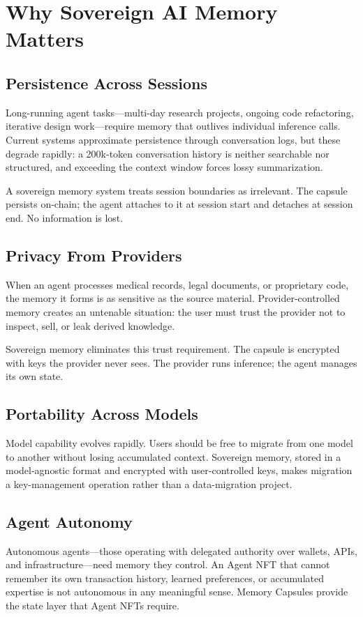 \section{Why Sovereign AI Memory Matters}

\label{sec:why}

\subsection{Persistence Across Sessions}

Long-running agent tasks---multi-day research projects, ongoing code refactoring, iterative design work---require memory that outlives individual inference calls. Current systems approximate persistence through conversation logs, but these degrade rapidly: a 200k-token conversation history is neither searchable nor structured, and exceeding the context window forces lossy summarization.

A sovereign memory system treats session boundaries as irrelevant. The capsule persists on-chain; the agent attaches to it at session start and detaches at session end. No information is lost.

\subsection{Privacy From Providers}

When an agent processes medical records, legal documents, or proprietary code, the memory it forms is as sensitive as the source material. Provider-controlled memory creates an untenable situation: the user must trust the provider not to inspect, sell, or leak derived knowledge.

Sovereign memory eliminates this trust requirement. The capsule is encrypted with keys the provider never sees. The provider runs inference; the agent manages its own state.

\subsection{Portability Across Models}

Model capability evolves rapidly. Users should be free to migrate from one model to another without losing accumulated context. Sovereign memory, stored in a model-agnostic format and encrypted with user-controlled keys, makes migration a key-management operation rather than a data-migration project.

\subsection{Agent Autonomy}

Autonomous agents---those operating with delegated authority over wallets, APIs, and infrastructure---need memory they control. An Agent NFT \cite{zoo-agent-nft} that cannot remember its own transaction history, learned preferences, or accumulated expertise is not autonomous in any meaningful sense. Memory Capsules provide the state layer that Agent NFTs require.

